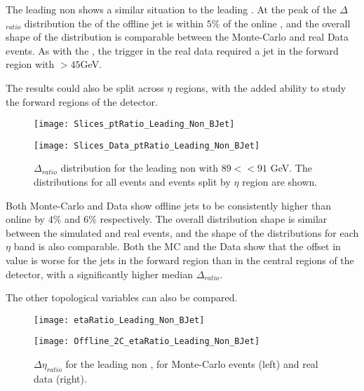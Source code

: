 	The leading non \bjet shows a similar situation to the leading \bjet. At the peak of the $\Delta $\pt$_{ratio}$ distribution the \pt of the offline jet is within $5\%$ of the online \pt, and the overall shape of the distribution is comparable between the Monte-Carlo and real Data events. As with the \bjets, the trigger in the real data required a jet in the forward region with \pt$>45$GeV. 
	
	The results could also be split across $\eta$ regions, with the added ability to study the forward regions of the detector. 
	
	\begin{figure}[h]
		\centering
		
		\begin{minipage}[h]{0.33\linewidth}
			\texttt{[image: Slices\_ptRatio\_Leading\_Non\_BJet]}
		\end{minipage}
		\quad
		\begin{minipage}[h]{0.33\linewidth}
			\texttt{[image: Slices\_Data\_ptRatio\_Leading\_Non\_BJet]}
		\end{minipage}
		\caption{$\Delta $\pt$_{ratio}$ distribution for the leading non \bjet with $89<$\pt$<91$ GeV. The distributions for all events and events split by $\eta$ region are shown.}
		\label{fig:O:leadingnonbptslice}
	\end{figure}
	
	Both Monte-Carlo and Data show offline jets to be consistently higher \pt than online by $4\%$ and $6\%$ respectively. The overall distribution shape is similar between the simulated and real events, and the shape of the distributions for each $\eta$ band is also comparable. Both the MC and the Data show that the offset in \pt value is worse for the jets in the forward region than in the central regions of the detector, with a significantly higher median $\Delta $\pt$_{ratio}$. 
	
	The other topological variables can also be compared.
	
	\begin{figure}[h]
		\centering
		\begin{minipage}[h]{0.33\linewidth}
			\texttt{[image: etaRatio\_Leading\_Non\_BJet]}
			
		\end{minipage}
		\quad
		\begin{minipage}[h]{0.33\linewidth}
			\texttt{[image: Offline\_2C\_etaRatio\_Leading\_Non\_BJet]}
		\end{minipage}
		\caption{$\Delta \eta_{ratio}$ for the leading non \bjet, for Monte-Carlo events (left) and real data (right).}
		\label{fig:O:leadingnonbeta}
	\end{figure}
	
